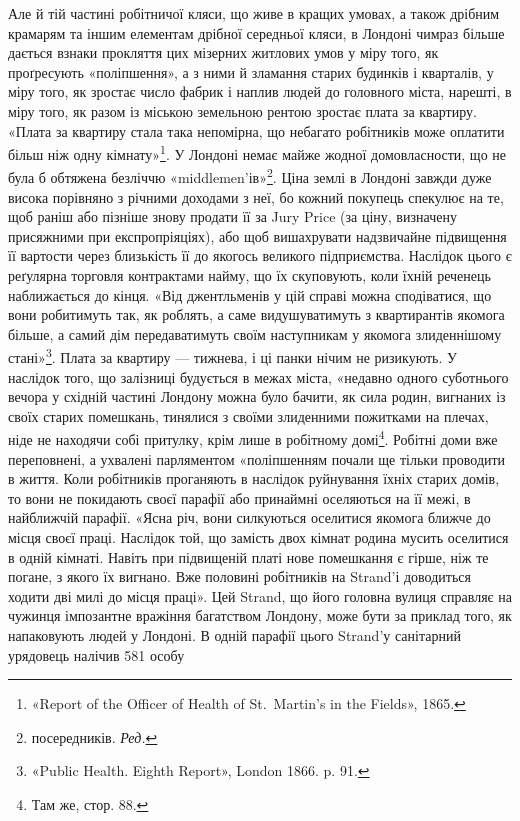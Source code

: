Але й тій частині робітничої кляси, що живе в кращих умовах,
а також дрібним крамарям та іншим елементам дрібної
середньої кляси, в Лондоні чимраз більше дається взнаки прокляття
цих мізерних житлових умов у міру того, як проґресують
«поліпшення», а з ними й зламання старих будинків і кварталів,
у міру того, як зростає число фабрик і наплив людей до головного
міста, нарешті, в міру того, як разом із міською земельною
рентою зростає плата за квартиру. «Плата за квартиру стала
така непомірна, що небагато робітників може оплатити більш
ніж одну кімнату»\footnote{
«Report of the Officer of Health of St.~Martin’s in the Fields», 1865.
}. У Лондоні немає майже жодної домовласности,
що не була б обтяжена безліччю «middlemen’ів»\footnote*{
посередників. \emph{Ред.}
}. Ціна
землі в Лондоні завжди дуже висока порівняно з річними доходами
з неї, бо кожний покупець спекулює на те, щоб раніш або
пізніше знову продати її за Jury Price (за ціну, визначену присяжними
при експропріяціях), або щоб вишахрувати надзвичайне
підвищення її вартости через близькість її до якогось великого
підприємства. Наслідок цього є реґулярна торговля контрактами
найму, що їх скуповують, коли їхній реченець наближається
до кінця. «Від джентльменів у цій справі можна сподіватися, що
вони робитимуть так, як роблять, а саме видушуватимуть з
квартирантів якомога більше, а самий дім передаватимуть своїм
наступникам у якомога злиденнішому стані»\footnote{
«Public Health. Eighth Report», London 1866. p. 91.
}. Плата за квартиру
— тижнева, і ці панки нічим не ризикують. У наслідок
того, що залізниці будується в межах міста, «недавно одного
суботнього вечора у східній частині Лондону можна було бачити,
як сила родин, вигнаних із своїх старих помешкань, тинялися
з своїми злиденними пожитками на плечах, ніде не находячи
собі притулку, крім лише в робітному домі\footnote{
Там же, стор. 88.
}. Робітні
доми вже переповнені, а ухвалені парляментом «поліпшенням
почали ще тільки проводити в життя. Коли робітників проганяють
в наслідок руйнування їхніх старих домів, то вони не покидають
своєї парафії або принаймні оселяються на її межі, в найближчій
парафії. «Ясна річ, вони силкуються оселитися якомога
ближче до місця своєї праці. Наслідок той, що замість двох кімнат
родина мусить оселитися в одній кімнаті. Навіть при підвищеній
платі нове помешкання є гірше, ніж те погане, з якого їх вигнано.
Вже половині робітників на Strand’і доводиться ходити дві милі
до місця праці». Цей Strand, що його головна вулиця справляє
на чужинця імпозантне вражіння багатством Лондону, може
бути за приклад того, як напаковують людей у Лондоні. В одній
парафії цього Strand’у санітарний урядовець налічив 581 особу
\parbreak{}  %
